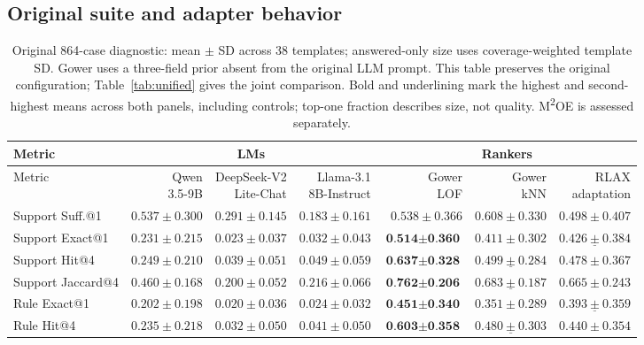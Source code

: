 \documentclass[conference]{IEEEtran}
\begin{document}
\subsection{Original suite and adapter behavior}
\begin{table}[t]
\centering
\caption{Original 864-case diagnostic: mean $\pm$ SD across 38 templates; answered-only size uses coverage-weighted template SD. Gower uses a three-field prior absent from the original LLM prompt. This table preserves the original configuration; Table~\ref{tab:unified} gives the joint comparison. Bold and underlining mark the highest and second-highest means across both panels, including controls; top-one fraction describes size, not quality. M\textsuperscript{2}OE is assessed separately.}
\begin{tabular}{|l|rrrrrr|}
\hline
Metric & \multicolumn{3}{c|}{LMs} & \multicolumn{3}{c|}{Rankers} \\
\hline
Metric & \shortstack{Qwen\\3.5-9B} & \shortstack{DeepSeek-V2\\Lite-Chat} & \shortstack{Llama-3.1\\8B-Instruct} & \shortstack{Gower\\LOF} & \shortstack{Gower\\kNN} & \shortstack{RLAX\\adaptation} \\
\hline
Support Suff.@1 & $0.537\pm0.300$ & $0.291\pm0.145$ & $0.183\pm0.161$ & $0.538\pm0.366$ & $0.608\pm0.330$ & $0.498\pm0.407$ \\
Support Exact@1 & $0.231\pm0.215$ & $0.023\pm0.037$ & $0.032\pm0.043$ & $\textbf{0.514}\pm\textbf{0.360}$ & $0.411\pm0.302$ & $\underline{0.426\pm0.384}$ \\
Support Hit@4 & $0.249\pm0.210$ & $0.039\pm0.051$ & $0.049\pm0.059$ & $\textbf{0.637}\pm\textbf{0.328}$ & $\underline{0.499\pm0.284}$ & $0.478\pm0.367$ \\
Support Jaccard@4 & $0.460\pm0.168$ & $0.200\pm0.052$ & $0.216\pm0.066$ & $\textbf{0.762}\pm\textbf{0.206}$ & $\underline{0.683\pm0.187}$ & $0.665\pm0.243$ \\
\hline
Rule Exact@1 & $0.202\pm0.198$ & $0.020\pm0.036$ & $0.024\pm0.032$ & $\textbf{0.451}\pm\textbf{0.340}$ & $0.351\pm0.289$ & $\underline{0.393\pm0.359}$ \\
Rule Hit@4 & $0.235\pm0.218$ & $0.032\pm0.050$ & $0.041\pm0.050$ & $\textbf{0.603}\pm\textbf{0.358}$ & $\underline{0.480\pm0.303}$ & $0.440\pm0.354$ \\
\hline

\end{tabular}
\end{table}
\end{document}

